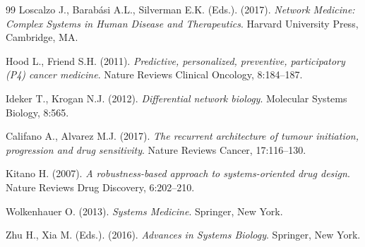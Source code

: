 \begin{thebibliography}{99}
 Loscalzo J., Barabási A.L., Silverman E.K. (Eds.). (2017). \textit{Network Medicine: Complex Systems in Human Disease and Therapeutics}. Harvard University Press, Cambridge, MA.

 Hood L., Friend S.H. (2011). \textit{Predictive, personalized, preventive, participatory (P4) cancer medicine}. Nature Reviews Clinical Oncology, 8:184--187.

 Ideker T., Krogan N.J. (2012). \textit{Differential network biology}. Molecular Systems Biology, 8:565.

 Califano A., Alvarez M.J. (2017). \textit{The recurrent architecture of tumour initiation, progression and drug sensitivity}. Nature Reviews Cancer, 17:116--130.

 Kitano H. (2007). \textit{A robustness-based approach to systems-oriented drug design}. Nature Reviews Drug Discovery, 6:202--210.

 Wolkenhauer O. (2013). \textit{Systems Medicine}. Springer, New York.

 Zhu H., Xia M. (Eds.). (2016). \textit{Advances in Systems Biology}. Springer, New York.

\end{thebibliography}

